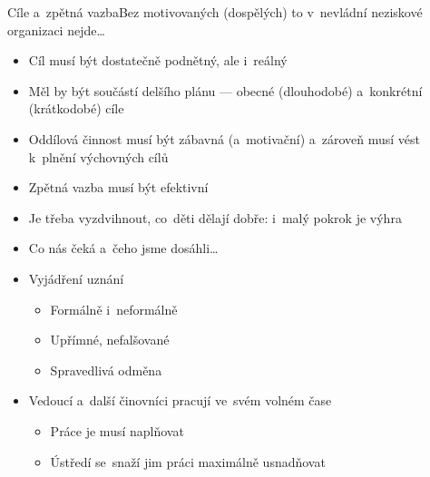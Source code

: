 \documentclass[compress, ucs, xelatex, 11pt, xcolor=dvipsnames, print,
	hyperref={
		bookmarks=true,
		unicode=true,
		colorlinks=true,
		pdftitle={Skautska vychovna metoda},
		plainpages=false,
		pdfauthor={Vojtech Zeisek},
		pdfsubject={Skautska vychovna metoda a jeji vyvoj za posledni stoleti a desetileti},
		pdfcreator={XeLaTeX},
		pdfkeywords={Junak, Pedagogika, Skaut, Skauting, Vychovna metoda},
		linkcolor=Black,
		anchorcolor=Black,
		citecolor=OliveGreen,
		filecolor=OliveGreen,
		menucolor=Black,
		urlcolor=OliveGreen,
		pdftex},
	url={hyphens, lowtilde} %
	]{beamer}
\begin{document}
\begin{frame}{Cíle a~zpětná vazba}{Bez motivovaných (dospělých) to v~nevládní neziskové organizaci nejde\ldots}
	\begin{multicols}{2}
		\begin{itemize}
			\item Cíl musí být dostatečně podnětný, ale i~reálný
			\item Měl by být součástí delšího plánu --- obecné (dlouhodobé) a~konkrétní (krátkodobé) cíle
			\item Oddílová činnost musí být zábavná (a~motivační) a~zároveň musí vést k~plnění výchovných cílů
			\item Zpětná vazba musí být efektivní
			\item Je třeba vyzdvihnout, co~děti dělají dobře: i~malý pokrok je výhra
			\item Co nás čeká a~čeho jsme dosáhli\ldots
			\item Vyjádření uznání
			\begin{itemize}
				\item Formálně i~neformálně
				\item Upřímné, nefalšované
				\item Spravedlivá odměna
			\end{itemize}
		\end{itemize}
	\end{multicols}
	\begin{itemize}
		\item Vedoucí a~další činovníci pracují ve~svém volném čase
		\begin{itemize}
			\item Práce je musí naplňovat
			\item Ústředí se~snaží jim práci maximálně usnadňovat
		\end{itemize}
	\end{itemize}
\end{frame}
\end{document}
